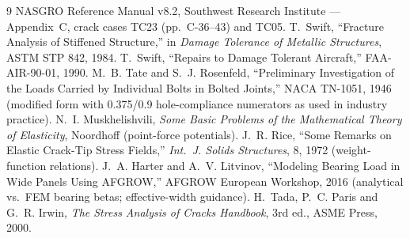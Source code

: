 \documentclass[11pt]{article}
\begin{document}
\begin{thebibliography}{9}
 NASGRO Reference Manual v8.2, Southwest Research
  Institute --- Appendix~C, crack cases TC23 (pp.~C-36--43) and TC05.
 T.~Swift, ``Fracture Analysis of Stiffened Structure,''
  in \emph{Damage Tolerance of Metallic Structures}, ASTM STP 842, 1984.
 T.~Swift, ``Repairs to Damage Tolerant Aircraft,''
  FAA-AIR-90-01, 1990.
 M.~B. Tate and S.~J. Rosenfeld, ``Preliminary Investigation
  of the Loads Carried by Individual Bolts in Bolted Joints,'' NACA TN-1051,
  1946 (modified form with 0.375/0.9 hole-compliance numerators as used in
  industry practice).
 N.~I. Muskhelishvili, \emph{Some Basic Problems of the
  Mathematical Theory of Elasticity}, Noordhoff (point-force potentials).
 J.~R. Rice, ``Some Remarks on Elastic Crack-Tip Stress
  Fields,'' \emph{Int.\ J. Solids Structures}, 8, 1972 (weight-function
  relations).
 J.~A. Harter and A.~V. Litvinov, ``Modeling Bearing Load in
  Wide Panels Using AFGROW,'' AFGROW European Workshop, 2016 (analytical
  vs.\ FEM bearing betas; effective-width guidance).
 H.~Tada, P.~C. Paris and G.~R. Irwin, \emph{The Stress
  Analysis of Cracks Handbook}, 3rd ed., ASME Press, 2000.
\end{thebibliography}
\end{document}
